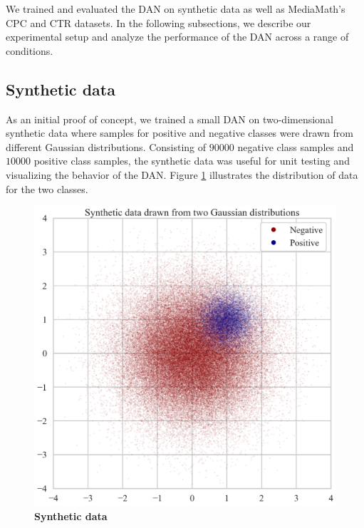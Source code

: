 \documentclass{proc}
\begin{document}
We trained and evaluated the DAN on synthetic data as well as MediaMath's CPC and CTR datasets. In the following subsections, we describe our experimental setup and analyze the performance of the DAN across a range of conditions.

\subsection{Synthetic data}

As an initial proof of concept, we trained a small DAN on two-dimensional synthetic data where samples for positive and negative classes were drawn from different Gaussian distributions. Consisting of $90000$ negative class samples and $10000$ positive class samples, the synthetic data was useful for unit testing and visualizing the behavior of the DAN. Figure \ref{fig:synthetic-data} illustrates the distribution of data for the two classes.

\begin{figure}[h!]
	\begin{center}
		\includegraphics*[scale=0.3]{../figures/synthetic-data.png}
		\caption{\textbf{Synthetic data}}
		\label{fig:synthetic-data}
	\end{center}
\end{figure}
\end{document}

